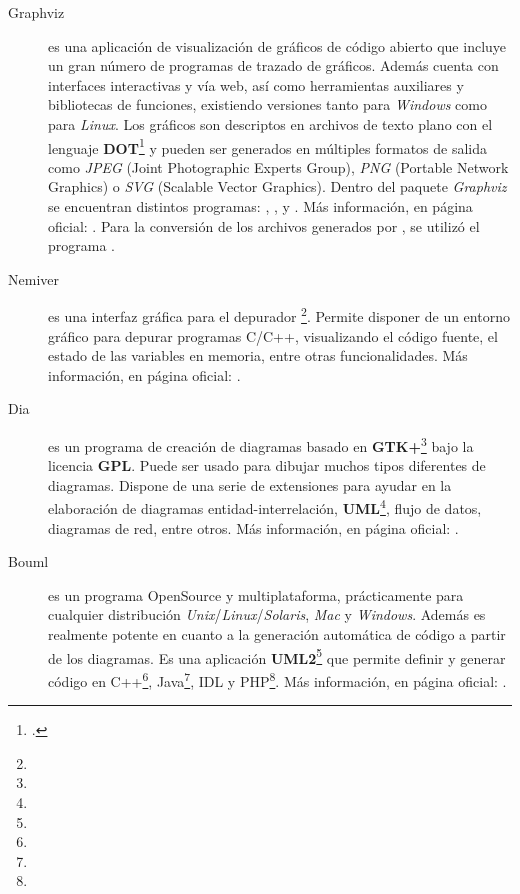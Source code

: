\begin{description}
\item [Graphviz] es una aplicación de visualización de gráficos de código abierto que incluye un gran número de programas de trazado de gráficos. Además cuenta con interfaces interactivas y vía web, así como herramientas auxi\-liares y bibliotecas de funciones, existiendo versiones tanto para \textit{Windows} como para \textit{Linux}. Los gráficos son descriptos en archivos de texto plano con el lenguaje \textbf{DOT}\footnote{.} y pueden ser generados en múltiples formatos de salida como \textit{JPEG} (Joint Photographic Experts Group), \textit{PNG} (Portable Network Graphics) o \textit{SVG} (Scalable Vector Graphics). Dentro del paquete \textit{Graphviz} se encuentran distintos programas: , ,  y . Más información, en página oficial: .
Para la conversión de los archivos generados por \maggen, se utilizó el programa .

\item [Nemiver] es una interfaz gráfica para el depurador \footnote{}. Permite disponer de un entorno gráfico para depurar programas C/C++, visualizando el código fuente, el estado de las variables en memoria, entre otras funcionalidades. Más información, en página oficial: .

\item [Dia] es un programa de creación de diagramas basado en \textbf{GTK+}\footnote{} bajo la licencia \textbf{GPL}. Puede ser usado para dibujar muchos tipos diferentes de diagramas. Dispone de una serie de extensiones para ayudar en la elaboración de diagramas entidad-interrelación, \textbf{UML}\footnote{}, flujo de datos, diagramas de red, entre otros. Más información, en página oficial: .

\item[Bouml] es un programa OpenSource y multiplataforma, prácticamente para cualquier distribución \textit{Unix}/\textit{Linux}/\textit{Solaris}, \textit{Mac} y \textit{Windows}. Además es realmente potente en cuanto a la generación automática de código a partir de los diagramas. Es una aplicación \textbf{UML2}\footnote{} que permite definir y generar código en C++\footnote{}, Java\footnote{}, IDL y PHP\footnote{}. Más información, en página oficial: .


\end{description}
